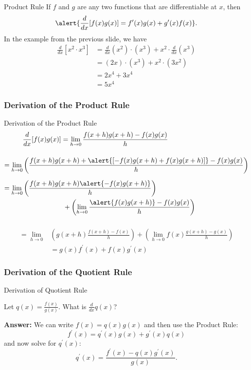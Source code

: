 \documentclass[cal1spr16Lectures.tex]{subfiles}
\begin{document}
\begin{frame}{\small Product Rule}\footnotesize
If $f$ and $g$ are any two functions that are differentiable at $x$, then
\[\alert{\frac{d}{dx}[f(x) g(x)] = f^{\prime}(x) g(x) + g^{\prime}(x) f(x)}.\]
In the example from the previous slide, we have
\begin{align*}
\frac{d}{dx}[x^2\cdot x^3] &= \frac{d}{dx}(x^2)\cdot (x^3)+x^2\cdot\frac{d}{dx}(x^3) \\
 &= (2x)\cdot (x^3)+x^2\cdot (3x^2) \\[0.25pc]
 &= 2x^4+3x^4 \\[0.25pc]
 &= 5x^4
\end{align*}
\end{frame}

\subsubsection{Derivation of the Product Rule}

\begin{frame}[allowframebreaks]{\small Derivation of the Product Rule}\footnotesize
\begin{align*}
&\frac{d}{dx}[f(x)g(x)] = \lim_{h \to 0} \frac{f(x+h)g(x+h)-f(x)g(x)}{h} \\[1pc]
 =\lim_{h \to 0} &\left(\frac{f(x+h)g(x+h)+\alert{[-f(x)g(x+h)+f(x)g(x+h)]}-f(x)g(x)}{h}\right) \\[0.5pc] 
 =\lim_{h \to 0} &\left(\frac{f(x+h)g(x+h)\alert{-f(x)g(x+h)}}{h}\right) \\
&\hspace{5pc} + \left(\lim_{h \to 0}\frac{\alert{f(x)g(x+h)}-f(x)g(x)}{h}\right) \\[0.5pc]
\end{align*} 

\framebreak
\begin{align*} 
 =\lim_{h \to 0} &\left(g(x+h) \frac{f(x+h)-f(x)}{h}\right) + \left(\lim_{h \to 0} f(x) \frac{g(x+h)-g(x)}{h}\right) \\[0.5pc]
 &=g(x)f^{\prime}(x)+f(x)g^{\prime}(x)
\end{align*}
\end{frame}

\subsubsection{Derivation of the Quotient Rule}

\begin{frame}{\small Derivation of Quotient Rule}\footnotesize
\begin{que} Let $q(x)=\frac{f(x)}{g(x)}$.  What is $\frac{d}{dx}q(x)$? \end{que}
{\bf Answer:} We can write $f(x)=q(x) g(x)$ and then use the Product Rule:
\[f^{\prime}(x) = q^{\prime}(x) g(x) + g^{\prime}(x) q(x)\] 
and now solve for $q^{\prime}(x)$: 
\[q^{\prime}(x)=\frac{f^{\prime}(x)-q(x)g^{\prime}(x)}{g(x)}.\]
\end{frame} 
\end{document}
